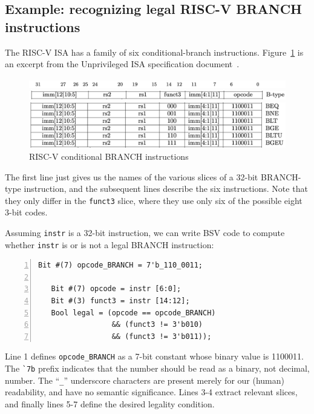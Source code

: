 
\subsection{Example: recognizing legal RISC-V BRANCH instructions}

The RISC-V ISA has a family of six conditional-branch instructions.
Figure~\ref{Fig_Combo_BRANCH_instrs} is an excerpt from the Unprivileged ISA
specification document~\cite{RISCV_Unpriv_2019_12_13}.
\begin{figure}[htbp]
  \centerline{\includegraphics[width=6in,angle=0]{Figures/Fig_Combo_BRANCH_instrs_1}}
  \centerline{\includegraphics[width=6in,angle=0]{Figures/Fig_Combo_BRANCH_instrs_2}}
  \vspace{2mm}
  \centerline{\includegraphics[width=6in,angle=0]{Figures/Fig_Combo_BRANCH_instrs_3}}
  \caption{\label{Fig_Combo_BRANCH_instrs}RISC-V conditional BRANCH instructions}
\end{figure}
The first line just gives us the names of the various slices of a
32-bit BRANCH-type instruction, and the subsequent lines describe the
six instructions.  Note that they only differ in the \verb|funct3|
slice, where they use only six of the possible eight 3-bit codes.

Assuming \verb|instr| is a 32-bit instruction, we can write BSV code
to compute whether \verb|instr| is or is not a legal BRANCH
instruction:

{\small
\begin{Verbatim}[frame=single, numbers=left]
   Bit #(7) opcode_BRANCH = 7'b_110_0011;

   Bit #(7) opcode = instr [6:0];
   Bit #(3) funct3 = instr [14:12];
   Bool legal = (opcode == opcode_BRANCH)
                 && (funct3 != 3'b010)
                 && (funct3 != 3'b011));
\end{Verbatim}
}

Line 1 defines \verb|opcode_BRANCH| as a 7-bit constant whose binary
value is 1100011.  The \verb|`7b| prefix indicates that the number
should be read as a binary, not decimal, number.  The ``\verb|_|''
underscore characters are present merely for our (human) readability,
and have no semantic significance.  Lines 3-4 extract relevant slices,
and finally lines 5-7 define the desired legality condition.


